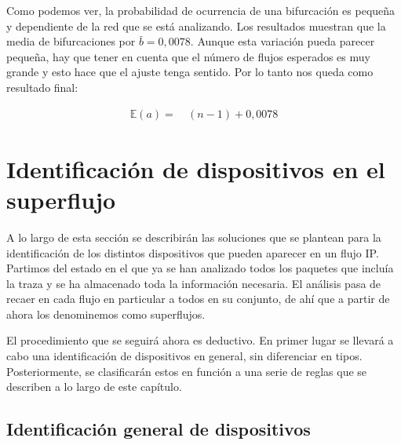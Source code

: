 \documentclass[tfg,epsbased,lof,lot,loa,covers,final,copyright,overleaf]{tfgtfmthesisuam}
\begin{document}
Como podemos ver, la probabilidad de ocurrencia de una bifurcación es pequeña y dependiente de la red que se está analizando. Los resultados muestran que la media de bifurcaciones por $\bar{b} = 0,0078$. Aunque esta variación pueda parecer pequeña, hay que tener en cuenta que el número de flujos esperados es muy grande y esto hace que el ajuste tenga sentido. Por lo tanto nos queda como resultado final:

\begin{align*}
 \mathbb{E}(a) =&\ (n - 1) + 0,0078
\end{align*}

\section{Identificación de dispositivos en el superflujo}
\label{sec:Analisis:Dispositivos}
A lo largo de esta sección se describirán las soluciones que se plantean para la identificación de los distintos dispositivos que pueden aparecer en un flujo IP. Partimos del estado en el que ya se han analizado todos los paquetes que incluía la traza y se ha almacenado toda la información necesaria. El análisis pasa de recaer en cada flujo en particular a todos en su conjunto, de ahí que a partir de ahora los denominemos como superflujos.

El procedimiento que se seguirá ahora es deductivo. En primer lugar se llevará a cabo una identificación de dispositivos en general, sin diferenciar en tipos. Posteriormente, se clasificarán estos en función a una serie de reglas que se describen a lo largo de este capítulo.

\subsection{Identificación general de dispositivos}
\end{document}

